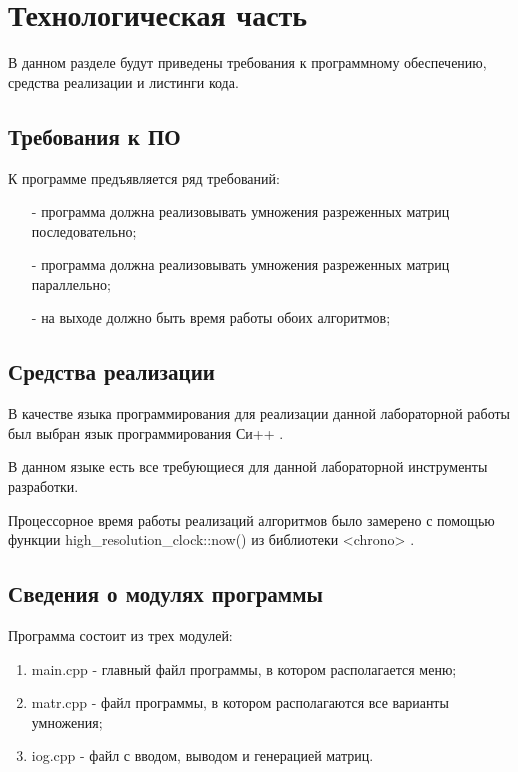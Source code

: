 \chapter{Технологическая часть}

В данном разделе будут приведены требования к программному обеспечению, средства реализации и листинги кода.

\section{Требования к ПО}

К программе предъявляется ряд требований:
\begin{itemize}
	\item[-] программа должна реализовывать умножения разреженных матриц последовательно;
	\item[-] программа должна реализовывать умножения разреженных матриц параллельно;
	\item[-] на выходе должно быть время работы обоих алгоритмов;
\end{itemize}

\section{Средства реализации}

В качестве языка программирования для реализации данной лабораторной работы был выбран язык программирования Си++ \cite{pythonlang}. 

В данном языке есть все требующиеся для данной лабораторной инструменты разработки. 

Процессорное время работы реализаций алгоритмов было замерено с помощью функции high\_resolution\_clock::now() из библиотеки <chrono> \cite{pythonlangtime}.

\section{Сведения о модулях программы}
Программа состоит из трех модулей:
\begin{enumerate}
	\item main.cpp - главный файл программы, в котором располагается меню;
	\item matr.cpp - файл программы, в котором располагаются все варианты умножения;
	\item iog.cpp - файл с вводом, выводом и генерацией матриц.
\end{enumerate}


